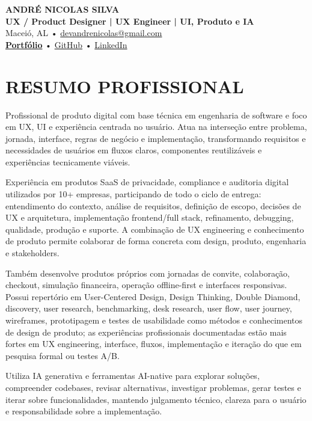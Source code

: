 \documentclass[10pt,a4paper]{article}
\begin{document}
\begin{center}
{\LARGE \textbf{ANDRÉ NICOLAS SILVA}}\\[-2pt]
{\normalsize \textbf{UX / Product Designer | UX Engineer | UI, Produto e IA}}\\[1pt]
\footnotesize Maceió, AL \quad • \quad \href{mailto:devandrenicolas@gmail.com}{devandrenicolas@gmail.com}\\[-1pt]
\textbf{\href{https://portfolio-andrenicolas.vercel.app}{Portfólio}} \quad • \quad \href{https://github.com/devAndreNicolas}{GitHub} \quad • \quad \href{https://www.linkedin.com/in/devandrenicolas}{LinkedIn}
\end{center}

\vspace{-3pt}
\section*{RESUMO PROFISSIONAL}
\footnotesize
Profissional de produto digital com base técnica em engenharia de software e foco em UX, UI e experiência centrada no usuário. Atua na interseção entre problema, jornada, interface, regras de negócio e implementação, transformando requisitos e necessidades de usuários em fluxos claros, componentes reutilizáveis e experiências tecnicamente viáveis.

Experiência em produtos SaaS de privacidade, compliance e auditoria digital utilizados por 10+ empresas, participando de todo o ciclo de entrega: entendimento do contexto, análise de requisitos, definição de escopo, decisões de UX e arquitetura, implementação frontend/full stack, refinamento, debugging, qualidade, produção e suporte. A combinação de UX engineering e conhecimento de produto permite colaborar de forma concreta com design, produto, engenharia e stakeholders.

Também desenvolve produtos próprios com jornadas de convite, colaboração, checkout, simulação financeira, operação offline-first e interfaces responsivas. Possui repertório em User-Centered Design, Design Thinking, Double Diamond, discovery, user research, benchmarking, desk research, user flow, user journey, wireframes, prototipagem e testes de usabilidade como métodos e conhecimentos de design de produto; as experiências profissionais documentadas estão mais fortes em UX engineering, interface, fluxos, implementação e iteração do que em pesquisa formal ou testes A/B.

Utiliza IA generativa e ferramentas AI-native para explorar soluções, compreender codebases, revisar alternativas, investigar problemas, gerar testes e iterar sobre funcionalidades, mantendo julgamento técnico, clareza para o usuário e responsabilidade sobre a implementação.
\end{document}
